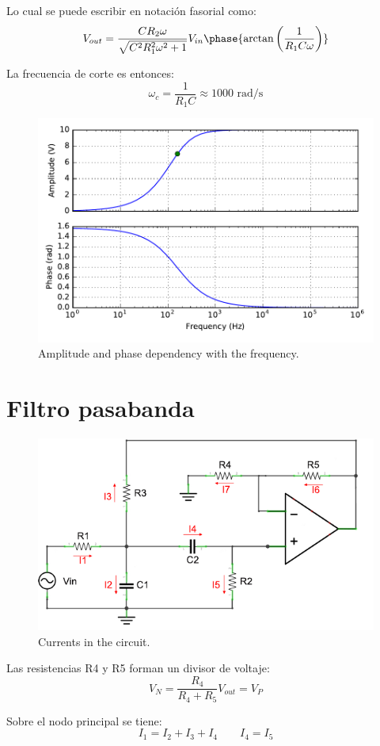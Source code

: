 \documentclass[11pt]{article}
\begin{document}
\noindent Lo cual se puede escribir en notaci\'on fasorial como:
\begin{equation}
	V_{out} = \dfrac{C R_{2}\omega}{\sqrt{C^{2} R_{1}^{2} \omega^{2} + 1}} V_{in}\phase{\arctan\left(\dfrac{1}{R_1C\omega}\right)}
\end{equation}

\noindent La frecuencia de corte es entonces:
\begin{equation}
	\omega_c = \dfrac{1}{R_1C} \approx 1000 \text{ rad/s}
\end{equation}

\pagebreak
\begin{figure}[h]
	\centering
	\includegraphics[width=0.5\linewidth]{filter.pdf}
	\caption{Amplitude and phase dependency with the frequency.}
\end{figure}

\section{Filtro pasabanda}
\begin{figure}[h]
	\centering
	\includegraphics[width=0.5\linewidth]{band-pass.pdf}
	\caption{Currents in the circuit.}
\end{figure}

Las resistencias R4 y R5 forman un divisor de voltaje:
\begin{equation}
	V_N=\dfrac{R_4}{R_4+R_5}V_{out} = V_P
\end{equation}

Sobre el nodo principal se tiene:
\begin{equation}\label{eq:principalNode}
	I_1=I_2+I_3+I_4 \qquad I_4=I_5
\end{equation}
\end{document}
